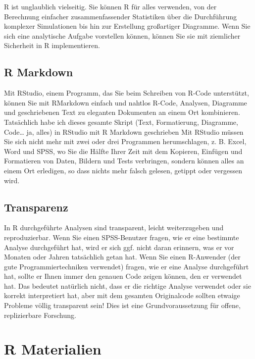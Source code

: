 \documentclass[
]{book}
\begin{document}
R ist unglaublich vielseitig. Sie können R für alles verwenden, von der Berechnung einfacher zusammenfassender Statistiken über die Durchführung komplexer Simulationen bis hin zur Erstellung großartiger Diagramme. Wenn Sie sich eine analytische Aufgabe vorstellen können, können Sie sie mit ziemlicher Sicherheit in R implementieren.

\hypertarget{r-markdown}{%
\section{R Markdown}\label{r-markdown}}

Mit RStudio, einem Programm, das Sie beim Schreiben von R-Code unterstützt, können Sie mit RMarkdown einfach und nahtlos R-Code, Analysen, Diagramme und geschriebenen Text zu eleganten Dokumenten an einem Ort kombinieren. Tatsächlich habe ich dieses gesamte Skript (Text, Formatierung, Diagramme, Code\ldots{} ja, alles) in RStudio mit R Markdown geschrieben Mit RStudio müssen Sie sich nicht mehr mit zwei oder drei Programmen herumschlagen, z. B. Excel, Word und SPSS, wo Sie die Hälfte Ihrer Zeit mit dem Kopieren, Einfügen und Formatieren von Daten, Bildern und Tests verbringen, sondern können alles an einem Ort erledigen, so dass nichts mehr falsch gelesen, getippt oder vergessen wird.

\hypertarget{transparenz}{%
\section{Transparenz}\label{transparenz}}

In R durchgeführte Analysen sind transparent, leicht weiterzugeben und reproduzierbar. Wenn Sie einen SPSS-Benutzer fragen, wie er eine bestimmte Analyse durchgeführt hat, wird er sich ggf. nicht daran erinnern, was er vor Monaten oder Jahren tatsächlich getan hat. Wenn Sie einen R-Anwender (der gute Programmiertechniken verwendet) fragen, wie er eine Analyse durchgeführt hat, sollte er Ihnen immer den genauen Code zeigen können, den er verwendet hat. Das bedeutet natürlich nicht, dass er die richtige Analyse verwendet oder sie korrekt interpretiert hat, aber mit dem gesamten Originalcode sollten etwaige Probleme völlig transparent sein! Dies ist eine Grundvoraussetzung für offene, replizierbare Forschung.

\hypertarget{r-materialien}{%
\chapter{R Materialien}\label{r-materialien}}
\end{document}
